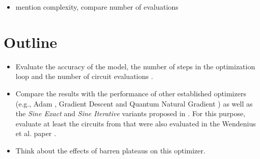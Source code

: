 \begin{itemize}
    \item mention complexity, compare number of evaluations
\end{itemize}

\section{Outline}
\begin{itemize}
    \item
        Evaluate the accuracy of the model, the number of steps in the
        optimization loop and the number of circuit evaluations
        \cite{wendenius_gradient-free_2023,ostaszewski_structure_2021}.
    \item
        Compare the results with the performance of other established
        optimizers (e.g., Adam \cite{kingma_adam_2017}, Gradient Descent and
        Quantum Natural Gradient \cite{stokes_quantum_2020}) as well as the
        \emph{Sine Exact} and \emph{Sine Iterative} variants proposed in
        \cite{wendenius_gradient-free_2023}.
        For this purpose, evaluate at least the circuits from
        \cite{sim_expressibility_2019} that were also evaluated in the
        Wendenius et al. paper \cite{wendenius_gradient-free_2023}.
    \item
        Think about the effects of barren plateaus on this optimizer.
\end{itemize}
